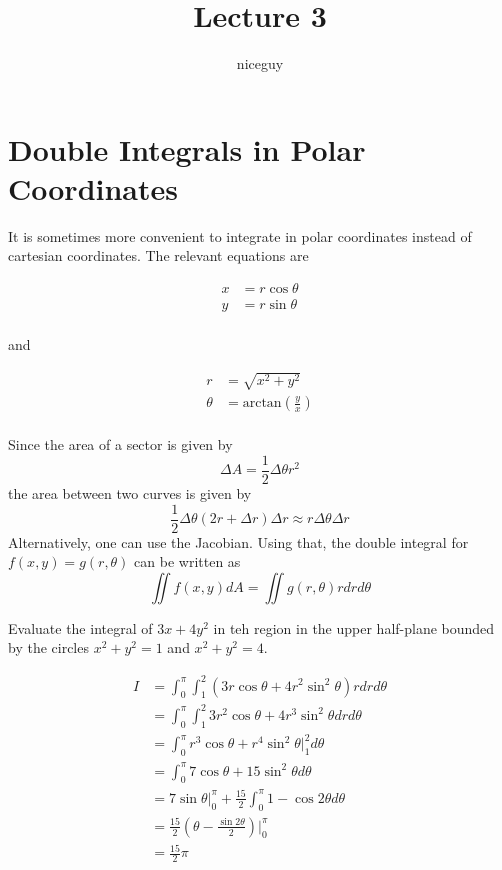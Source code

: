 \documentclass[12pt]{article}
\title{Lecture 3}
\author{niceguy}
\begin{document}
\maketitle

\section{Double Integrals in Polar Coordinates}
It is sometimes more convenient to integrate in polar coordinates instead of cartesian coordinates. The relevant equations are

\begin{align*}
x &= r\cos\theta \\
y &= r\sin\theta \\
\end{align*}

and

\begin{align*}
r &= \sqrt{x^2 + y^2} \\
\theta &= \text{arctan}\left(\frac{y}{x}\right) \\
\end{align*}

Since the area of a sector is given by $$\Delta A = \frac{1}{2} \Delta\theta r^2$$ the area between two curves is given by
$$\frac{1}{2} \Delta\theta (2r + \Delta r) \Delta r \approx r \Delta\theta \Delta r$$
Alternatively, one can use the Jacobian. Using that, the double integral for $f(x,y) = g(r,\theta)$ can be written as
$$\iint f(x,y) dA = \iint g(r,\theta) r dr d\theta$$

\begin{ex}
Evaluate the integral of $3x + 4y^2$ in teh region in the upper half-plane bounded by the circles $x^2 + y^2 = 1$ and $x^2 + y^2 = 4$.

\begin{align*}
I &= \int_0^\pi \int_1^2 (3r\cos \theta + 4r^2\sin^2\theta) r dr d\theta \\
&= \int_0^\pi \int_1^2 3r^2\cos\theta + 4r^3\sin^2\theta dr d\theta \\
&= \int_0^\pi r^3\cos\theta + r^4\sin^2\theta \Big |_1^2 d\theta \\
&= \int_0^\pi 7\cos\theta + 15\sin^2\theta d\theta \\
&= 7\sin\theta \Big |_0^\pi + \frac{15}{2}\int_0^\pi 1 - \cos2\theta d\theta \\
&= \frac{15}{2} \left(\theta - \frac{\sin2\theta}{2}\right) \Big |_0^\pi \\
&= \frac{15}{2} \pi \\
\end{align*}
\end{ex}
\end{document}
